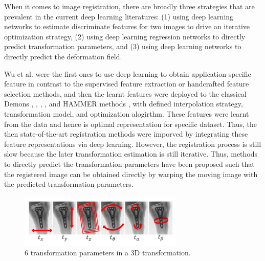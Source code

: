 \documentclass{report}
\begin{document}
	When it comes to image registration, there are broadly three strategies that are prevalent in the current deep learning literatures: (1) using deep learning networks to estimate discriminate features for two images to drive an iterative optimization strategy, (2) using deep learning regression networks to directly predict transformation parameters, and (3) using deep learning networks to directly predict the deformation field. \cite{Litjens_2017}
	
	Wu et al. \cite{7314894} \cite{Wu} were the first ones to use deep learning to obtain application specific feature in contrast to the supervised feature extraction or handcrafted feature selection methods, and then the learnt features were deployed to the classical Demons \cite{VERCAUTEREN2009S61}, \cite{10.1007/10704282_64}, \cite{10.1007/978-3-540-85990-1_117}, \cite{10.1007/978-3-642-24446-9_3}, \cite{Peyrat} and HAMMER methods \cite{Wu2010TPSHAMMERIH}, \cite{Shen} with defined interpolation strategy, transformation model, and optimization alogirthm. These features were learnt from the data and hence is optimal representation for specific dataset. Thus, the then state-of-the-art registration methods were imporved by integrating these feature representations via deep learning. However, the registration process is still slow because the later transformation estimation is still iterative. Thus, methods to directly predict the transformation parameters have been proposed such that the registered image can be obtained directly by warping the moving image with the predicted transformation parameters.
	
	\begin{figure}[h]
	\centering
	\includegraphics[width=0.7\textwidth]{resources/chapter2/tx_parameters.png}
	\caption{6 transformation parameters in a 3D transformation. \cite{7393571}}
	\label{fig:tx_parameters}
	\end{figure}
	
	
\end{document}
